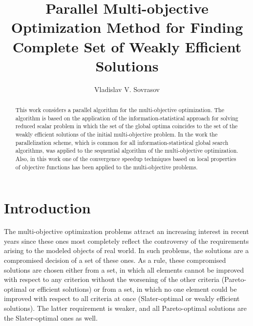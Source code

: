 \documentclass{llncs}
\begin{document}
%
\mainmatter              %
%
\title{Parallel Multi-objective Optimization Method for Finding Complete Set of Weakly Efficient Solutions
}
%
%
\author{Vladislav V. Sovrasov}
%
%
%

\maketitle              %

\begin{abstract}
This work considers a parallel algorithm for the multi-objective optimization. The
algorithm is based on the application of the information-statistical approach for solving
reduced scalar problem in which the set of the global optima coincides to the set of the
weakly efficient solutions of the initial multi-objective problem.
In the work the parallelization scheme, which is common for all information-statistical global search algorithms,
was applied to the sequential algorithm of the multi-objective optimization. Also, in this
work one of the convergence speedup techniques based on local properties of objective functions has been applied to the multi-objective
problems.

\end{abstract}
%
\section{Introduction}
The multi-objective optimization problems attract an increasing interest in recent years since
these ones most completely reflect the controversy of the requirements arising to the modeled objects of real
world. In such problems, the solutions are a compromised decision of a set
of these ones. As a rule, these compromised solutions are chosen either from a set, in which all
elements cannot be improved with respect to any criterion without the worsening of the other
criteria (Pareto-optimal or efficient solutions) or from a set, in which no one element could be
improved with respect to all criteria at once (Slater-optimal or weakly efficient solutions). The
latter requirement is weaker, and all Pareto-optimal solutions are the Slater-optimal ones as
well.
\end{document}
